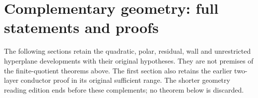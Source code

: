 \documentclass[11pt,reqno]{amsart}
\numberwithin{equation}{section}
\theoremstyle{definition}\newtheorem{definition}[theorem]{Definition}
\theoremstyle{remark}\newtheorem{remark}[theorem]{Remark}
\begin{document}
\section*{Complementary geometry: full statements and proofs}
The following sections retain the quadratic, polar, residual, wall and
unrestricted hyperplane developments with their original hypotheses.
They are not premises of the finite-quotient theorems above. The first
section also retains the earlier two-layer conductor proof in its
original sufficient range. The shorter geometry reading edition ends
before these complements; no theorem below is discarded.












\appendix








\end{document}
